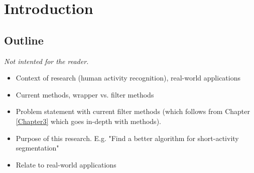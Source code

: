 
\chapter{Introduction}

\label{Chapter1} %



\section{Outline}
\emph{Not intented for the reader.}
\begin{itemize}
  \item Context of research (human activity recognition), real-world applications
  \item Current methods, wrapper vs. filter methods
  \item Problem statement with current filter methods (which follows from Chapter \ref{Chapter3} which goes in-depth with methods).
  \item Purpose of this research. E.g. "Find a better algorithm for short-activity segmentation"
  \item Relate to real-world applications
\end{itemize}